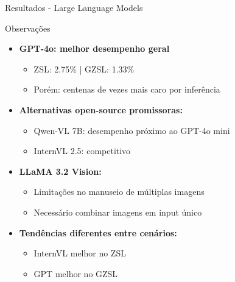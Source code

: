 \begin{frame}{Resultados - Large Language Models}
\begin{block}{Observações}
\begin{itemize}
    \item \textbf{GPT-4o: melhor desempenho geral}
    \begin{itemize}
        \item ZSL: 2.75\% | GZSL: 1.33\%
        \item Porém: centenas de vezes mais caro por inferência
    \end{itemize}
    
    \item \textbf{Alternativas open-source promissoras:}
    \begin{itemize}
        \item Qwen-VL 7B: desempenho próximo ao GPT-4o mini
        \item InternVL 2.5: competitivo
    \end{itemize}
    
    \item \textbf{LLaMA 3.2 Vision:}
    \begin{itemize}
        \item Limitações no manuseio de múltiplas imagens
        \item Necessário combinar imagens em input único
    \end{itemize}
    
    \item \textbf{Tendências diferentes entre cenários:}
    \begin{itemize}
        \item InternVL melhor no ZSL
        \item GPT melhor no GZSL
    \end{itemize}
\end{itemize}
\end{block}
\end{frame}

